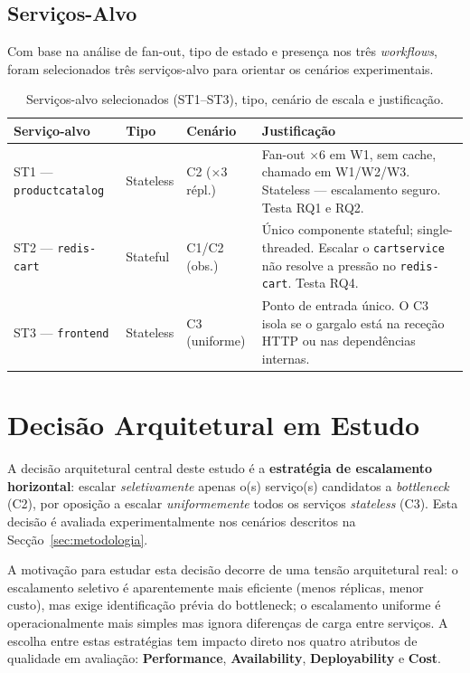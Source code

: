 \documentclass[manuscript,screen,review]{acmart}
\begin{document}
\subsection{Serviços-Alvo}

Com base na análise de fan-out, tipo de estado e presença nos três \textit{workflows}, foram selecionados três serviços-alvo para orientar os cenários experimentais.

\begin{table}[t]
\caption{Serviços-alvo selecionados (ST1--ST3), tipo, cenário de escala e justificação.}
\label{tab:alvos}
\begin{tabularx}{\columnwidth}{p{2cm}p{1.4cm}p{1.7cm}X}
\toprule
\textbf{Serviço-alvo} & \textbf{Tipo} & \textbf{Cenário} & \textbf{Justificação} \\
\midrule
ST1 — \texttt{productcatalog} & Stateless & C2 (×3 répl.) & Fan-out ×6 em W1, sem cache, chamado em W1/W2/W3. Stateless — escalamento seguro. Testa RQ1 e RQ2. \\
\addlinespace
ST2 — \texttt{redis-cart} & Stateful & C1/C2 (obs.) & Único componente stateful; single-threaded. Escalar o \texttt{cartservice} não resolve a pressão no \texttt{redis-cart}. Testa RQ4. \\
\addlinespace
ST3 — \texttt{frontend} & Stateless & C3 (uniforme) & Ponto de entrada único. O C3 isola se o gargalo está na receção HTTP ou nas dependências internas. \\
\bottomrule
\end{tabularx}
\end{table}

\section{Decisão Arquitetural em Estudo}

A decisão arquitetural central deste estudo é a \textbf{estratégia de escalamento horizontal}: escalar \emph{seletivamente} apenas o(s) serviço(s) candidatos a \textit{bottleneck} (C2), por oposição a escalar \emph{uniformemente} todos os serviços \textit{stateless} (C3). Esta decisão é avaliada experimentalmente nos cenários descritos na Secção~\ref{sec:metodologia}.

A motivação para estudar esta decisão decorre de uma tensão arquitetural real: o escalamento seletivo é aparentemente mais eficiente (menos réplicas, menor custo), mas exige identificação prévia do bottleneck; o escalamento uniforme é operacionalmente mais simples mas ignora diferenças de carga entre serviços. A escolha entre estas estratégias tem impacto direto nos quatro atributos de qualidade em avaliação: \textbf{Performance}, \textbf{Availability}, \textbf{Deployability} e \textbf{Cost}.
\end{document}
